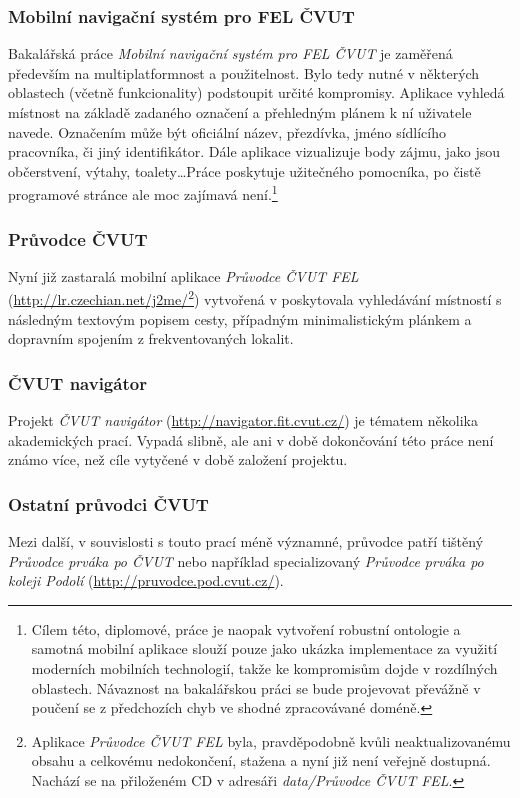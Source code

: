 \subsubsection{Mobilní navigační systém pro FEL ČVUT}
Bakalářská práce \emph{Mobilní navigační systém pro FEL ČVUT} \cite{Bakalarka} je zaměřená především na multiplatformnost a použitelnost. Bylo tedy nutné v některých oblastech (včetně funkcionality) podstoupit určité kompromisy. Aplikace vyhledá místnost na základě zadaného označení a přehledným plánem k ní uživatele navede. Označením může být oficiální název, přezdívka, jméno sídlícího pracovníka, či jiný identifikátor. Dále aplikace vizualizuje body zájmu, jako jsou občerstvení, výtahy, toalety\dots Práce poskytuje užitečného pomocníka, po čistě programové stránce ale moc zajímavá není.\footnote{Cílem této, diplomové, práce je naopak vytvoření robustní ontologie a samotná mobilní aplikace slouží pouze jako ukázka implementace za využití moderních mobilních technologií, takže ke kompromisům dojde v rozdílných oblastech. Návaznost na bakalářskou práci se bude projevovat převážně v poučení se z předchozích chyb ve shodné zpracovávané doméně.}

\subsubsection{Průvodce ČVUT}
Nyní již zastaralá mobilní aplikace \emph{Průvodce ČVUT FEL} (\url{http://lr.czechian.net/j2me/}\footnote{Aplikace \emph{Průvodce ČVUT FEL} byla, pravděpodobně kvůli neaktualizovanému obsahu a celkovému nedokončení, stažena a nyní již není veřejně dostupná. Nachází se na přiloženém \gls{CD} v adresáři \textit{data/Průvodce ČVUT FEL}.}) vytvořená v  poskytovala vyhledávání místností s následným textovým popisem cesty, případným minimalistickým plánkem a dopravním spojením z frekventovaných lokalit.

\subsubsection{ČVUT navigátor}
Projekt \emph{ČVUT navigátor} (\url{http://navigator.fit.cvut.cz/}) je tématem několika akademických prací. Vypadá slibně, ale ani v době dokončování této práce není známo více, než cíle vytyčené v době založení projektu.

\subsubsection{Ostatní průvodci ČVUT}
Mezi další, v souvislosti s touto prací méně významné, průvodce patří tištěný \emph{Průvodce prváka po ČVUT} \cite{PruvodcePrvaka} nebo například specializovaný \emph{Průvodce prváka po koleji Podolí} (\url{http://pruvodce.pod.cvut.cz/}).


